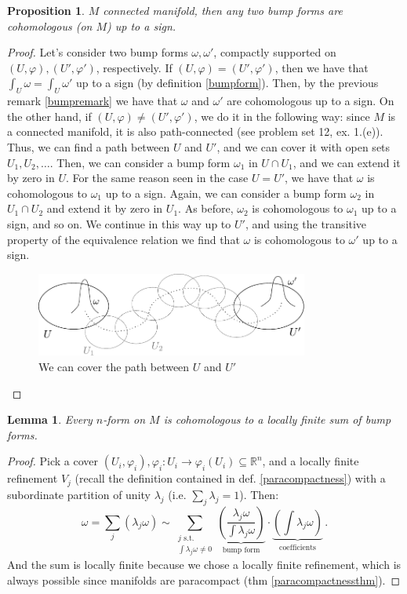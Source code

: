 \documentclass[a4paper,11pt,titlepage, article, oneside]{memoir}
\numberwithin{equation}{section}
\newtheorem{proposition}[theorem]{Proposition}
\newtheorem{lemma}[theorem]{Lemma}
\theoremstyle{definition}
\theoremstyle{remark}
\newcommand{\rfield}{\mathbb{R}}
\begin{document}
\begin{proposition} \label{prop2bumpforms}
$M$ connected manifold, then any two bump forms are cohomologous (on $M$) up to a sign.
\end{proposition}
\begin{proof}
Let's consider two bump forms $\omega, \omega'$, compactly supported on $(U, \varphi), (U', \varphi')$, respectively. If $(U, \varphi) = (U', \varphi')$, then we have that $\int_U \omega = \int_U \omega'$ up to a sign (by definition \ref{bumpform}). Then, by the previous remark \ref{bumpremark} we have that $\omega$ and $\omega'$ are cohomologous up to a sign. On the other hand, if $(U, \varphi) \not = (U', \varphi')$, we do it in the following way: since $M$ is a connected manifold, it is also path-connected (see problem set 12, ex. 1.(e)). Thus, we can find a path between $U$ and $U'$, and we can cover it with open sets $U_1, U_2, \ldots$.
Then, we can consider a bump form $\omega_1$ in $U \cap U_1$, and we can extend it by zero in $U$. For the same reason seen in the case $U=U'$, we have that $\omega$ is cohomologous to $\omega_1$ up to a sign. Again, we can consider a bump form $\omega_2$ in $U_1 \cap U_2$ and extend it by zero in $U_1$. As before, $\omega_2$ is cohomologous to $\omega_1$ up to a sign, and so on. We continue in this way up to $U'$, and using the transitive property of the equivalence relation we find that $\omega$ is cohomologous to $\omega'$ up to a sign.
\begin{figure}[H] \label{Fig:bumpforms1}
     \centering
     \includegraphics[width=0.8\textwidth]{Images/bumpforms1.pdf}
     \caption{We can cover the path between $U$ and $U'$}
\end{figure}
\end{proof}

\begin{lemma} \label{lemmalocfinite}
Every $n$-form on $M$ is cohomologous to a locally finite sum of bump forms.
\end{lemma}
\begin{proof}
Pick a cover $(U_i, \varphi_i), \varphi_i \colon U_i \rightarrow \varphi_i(U_i) \subseteq \rfield^n$, and a locally finite refinement $V_j$ (recall the definition contained in def. \ref{paracompactness}) with a subordinate partition of unity $\lambda_j$ (i.e. $\sum_j \lambda_j = 1$). Then:
\[ \omega = \sum\limits_j (\lambda_j \omega) \sim \sum\limits_{\substack{j \text{ s.t. } \\ \int \lambda_j \omega \not = 0}} \underbrace{\left( \frac{\lambda_j \omega}{\int \lambda_j \omega} \right)}_{\text{bump form}} \cdot \underbrace{\left ( \int \lambda_j \omega \right )}_{\text{coefficients}}  \, .\]
And the sum is locally finite because we chose a locally finite refinement, which is always possible since manifolds are paracompact (thm \ref{paracompactnessthm}).
\end{proof}
\end{document}
